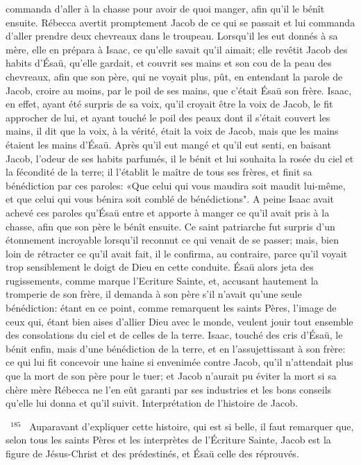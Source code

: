 \documentclass[paper=a5,pagesize=pdftex,fontsize=15pt,headinclude=on,twoside=off]{scrbook}
\newcommand{\negphantom}[1]{\settowidth{\dimen0}{#1}\hspace*{-\dimen0}}
\newcommand{\versenb}[1]{\par \vspace{10pt}~\negphantom{~${}^{#1}$~}${}^{#1}$~}
\begin{document}
commanda d'aller à la chasse pour avoir de quoi manger, afin qu'il le bénît ensuite. Rébecca avertit promptement
Jacob de ce qui se passait et lui commanda d'aller prendre deux chevreaux dans le troupeau. Lorsqu'il les eut
donnés à sa mère, elle en prépara à Isaac, ce qu'elle savait qu'il aimait; elle revêtit Jacob des habits d'Ésaü,
qu'elle gardait, et couvrit ses mains et son cou de la peau des chevreaux, afin que son père, qui ne voyait plus,
pût, en entendant la parole de Jacob, croire au moins, par le poil de ses mains, que c'était Ésaü son frère. Isaac,
en effet, ayant été surpris de sa voix, qu'il croyait être la voix de Jacob, le fit approcher de lui, et ayant touché le
poil des peaux dont il s'était couvert les mains, il dit que la voix, à la vérité, était la voix de Jacob, mais que les
mains étaient les mains d'Ésaü. Après qu'il eut mangé et qu'il eut senti, en baisant Jacob, l'odeur de ses habits
parfumés, il le bénit et lui souhaita la rosée du ciel et la fécondité de la terre; il l'établit le maître de tous ses frères,
et finit sa bénédiction par ces paroles: «Que celui qui vous maudira soit maudit lui-même, et que celui qui vous
bénira soit comblé de bénédictions".
A peine Isaac avait achevé ces paroles qu'Ésaü entre et apporte à manger ce qu'il avait pris à la chasse, afin que
son père le bénît ensuite. Ce saint patriarche fut surpris d'un étonnement incroyable lorsqu'il reconnut ce qui venait
de se passer; mais, bien loin de rétracter ce qu'il avait fait, il le confirma, au contraire, parce qu'il voyait trop
sensiblement le doigt de Dieu en cette conduite. Ésaü alors jeta des rugissements, comme marque l'Ecriture
Sainte, et, accusant hautement la tromperie de son frère, il demanda à son père s'il n'avait qu'une seule
bénédiction: étant en ce point, comme remarquent les saints Pères, l'image de ceux qui, étant bien aises d'allier
Dieu avec le monde, veulent jouir tout ensemble des consolations du ciel et de celles de la terre. Isaac, touché des
cris d'Ésaü, le bénit enfin, mais d'une bénédiction de la terre, et en l'assujettissant à son frère: ce qui lui fit
concevoir une haine si envenimée contre Jacob, qu'il n'attendait plus que la mort de son père pour le tuer; et Jacob
n'aurait pu éviter la mort si sa chère mère Rébecca ne l'en eût garanti par ses industries et les bons conseils
qu'elle lui donna et qu'il suivit.
Interprétation de l'histoire de Jacob.
\versenb{185} Auparavant d'expliquer cette histoire, qui est si belle, il faut remarquer que, selon tous les saints Pères et les
interprètes de l'Écriture Sainte, Jacob est la figure de Jésus-Christ et des prédestinés, et Ésaü celle des réprouvés.
\end{document}
